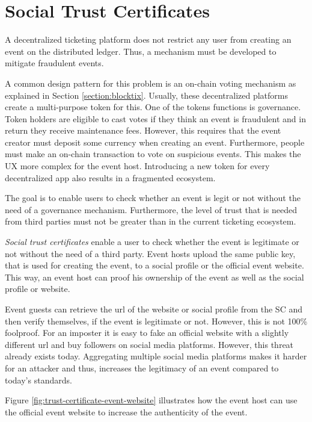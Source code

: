 
\section{Social Trust Certificates}\label{section:social-trust-certificates}

A decentralized ticketing platform does not restrict any user from creating an event on the distributed ledger. Thus, a mechanism must be developed to mitigate fraudulent events.

A common design pattern for this problem is an on-chain voting mechanism as explained in Section \ref{section:blocktix}. Usually, these decentralized platforms create a multi-purpose token for this. One of the tokens functions is governance. Token holders are eligible to cast votes if they think an event is fraudulent and in return they receive maintenance fees. However, this requires that the event creator must deposit some currency when creating an event. Furthermore, people must make an on-chain transaction to vote on suspicious events. This makes the UX more complex for the event host. Introducing a new token for every decentralized app also results in a fragmented ecosystem.

The goal is to enable users to check whether an event is legit or not without the need of a governance mechanism. Furthermore, the level of trust that is needed from third parties must not be greater than in the current ticketing ecosystem. 

\textit{Social trust certificates} enable a user to check whether the event is legitimate or not without the need of a third party. Event hosts upload the same public key, that is used for creating the event, to a social profile or the official event website. This way, an event host can proof his ownership of the event as well as the social profile or website. 

Event guests can retrieve the url of the website or social profile from the SC and then verify themselves, if the event is legitimate or not. However, this is not 100\% foolproof. For an imposter it is easy to fake an official website with a slightly different url and buy followers on social media platforms. However, this threat already exists today. Aggregating multiple social media platforms makes it harder for an attacker and thus, increases the legitimacy of an event compared to today's standards. 

Figure \ref{fig:trust-certificate-event-website} illustrates how the event host can use the official event website to increase the authenticity of the event. 

